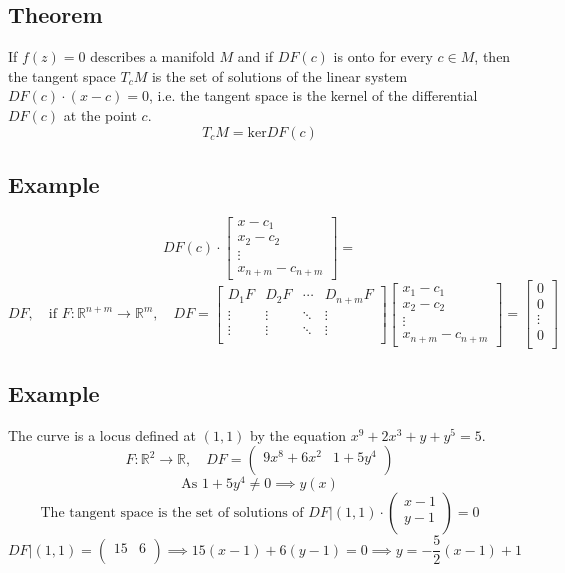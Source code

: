 \documentclass[11pt]{article}
\begin{document}
\subsection{Theorem}
If $f(z) = 0$ describes a manifold $M$ and if $DF(c)$ is onto for every $c \in M$, then the tangent space $T_c M$ is the set of solutions of the linear system $DF(c) \cdot (x - c) = 0$, i.e. the tangent space is the kernel of the differential $DF(c)$ at the point $c$.
\[
T_c M = \text{ker} DF(c)
\]

\subsection*{Example}
\[
DF(c) \cdot \begin{bmatrix}
    x - c_1 \\
    x_2 - c_2 \\
    \vdots \\
    x_{n+m} - c_{n+m}
\end{bmatrix} =
\]
\[
DF, \quad \text{if } F : \mathbb{R}^{n+m} \rightarrow \mathbb{R}^m, \quad DF = \begin{bmatrix}
    D_1F & D_2F & \cdots & D_{n+m}F \\
    \vdots & \vdots & \ddots & \vdots \\
    \vdots & \vdots & \ddots & \vdots \\
    \end{bmatrix} \begin{bmatrix}
    x_1 - c_1 \\
    x_2 - c_2 \\
    \vdots \\
    x_{n+m} - c_{n+m}
\end{bmatrix} = \begin{bmatrix}
    0 \\
    0 \\
    \vdots \\
    0 \\
\end{bmatrix}
\]

\subsection*{Example}
The curve is a locus defined at $(1,1)$ by the equation $x^9 + 2x^3 + y + y^5 = 5$.
\[
F : \mathbb{R}^2 \rightarrow \mathbb{R}, \quad DF = \begin{pmatrix}
    9x^8 + 6x^2 & 1 + 5y^4 \\
\end{pmatrix}
\]
\[
\text{As } 1 + 5y^4 \neq 0 \implies y(x)
\]
\[
\text{The tangent space is the set of solutions of } DF\big|{(1,1)} \cdot \begin{pmatrix}
    x - 1 \\
    y - 1 \\
\end{pmatrix} = 0
\]
\[
DF\big|{(1,1)} = \begin{pmatrix}
    15 & 6 \\
\end{pmatrix} \implies 15(x - 1) + 6(y - 1) = 0 \implies y = -\frac{5}{2}(x - 1) + 1
\]
\end{document}
